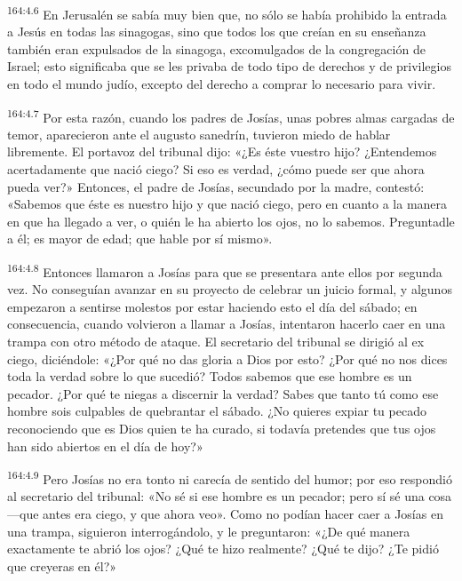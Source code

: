 \par 
\textsuperscript{164:4.6} En Jerusalén se sabía muy bien que, no sólo se había prohibido la entrada a Jesús en todas las sinagogas, sino que todos los que creían en su enseñanza también eran expulsados de la sinagoga, excomulgados de la congregación de Israel; esto significaba que se les privaba de todo tipo de derechos y de privilegios en todo el mundo judío, excepto del derecho a comprar lo necesario para vivir.

\par 
\textsuperscript{164:4.7} Por esta razón, cuando los padres de Josías, unas pobres almas cargadas de temor, aparecieron ante el augusto sanedrín, tuvieron miedo de hablar libremente. El portavoz del tribunal dijo: «¿Es éste vuestro hijo? ¿Entendemos acertadamente que nació ciego? Si eso es verdad, ¿cómo puede ser que ahora pueda ver?» Entonces, el padre de Josías, secundado por la madre, contestó: «Sabemos que éste es nuestro hijo y que nació ciego, pero en cuanto a la manera en que ha llegado a ver, o quién le ha abierto los ojos, no lo sabemos. Preguntadle a él; es mayor de edad; que hable por sí mismo».

\par 
\textsuperscript{164:4.8} Entonces llamaron a Josías para que se presentara ante ellos por segunda vez. No conseguían avanzar en su proyecto de celebrar un juicio formal, y algunos empezaron a sentirse molestos por estar haciendo esto el día del sábado; en consecuencia, cuando volvieron a llamar a Josías, intentaron hacerlo caer en una trampa con otro método de ataque. El secretario del tribunal se dirigió al ex ciego, diciéndole: «¿Por qué no das gloria a Dios por esto? ¿Por qué no nos dices toda la verdad sobre lo que sucedió? Todos sabemos que ese hombre es un pecador. ¿Por qué te niegas a discernir la verdad? Sabes que tanto tú como ese hombre sois culpables de quebrantar el sábado. ¿No quieres expiar tu pecado reconociendo que es Dios quien te ha curado, si todavía pretendes que tus ojos han sido abiertos en el día de hoy?»

\par 
\textsuperscript{164:4.9} Pero Josías no era tonto ni carecía de sentido del humor; por eso respondió al secretario del tribunal: «No sé si ese hombre es un pecador; pero sí sé una cosa ---que antes era ciego, y que ahora veo». Como no podían hacer caer a Josías en una trampa, siguieron interrogándolo, y le preguntaron: «¿De qué manera exactamente te abrió los ojos? ¿Qué te hizo realmente? ¿Qué te dijo? ¿Te pidió que creyeras en él?»

